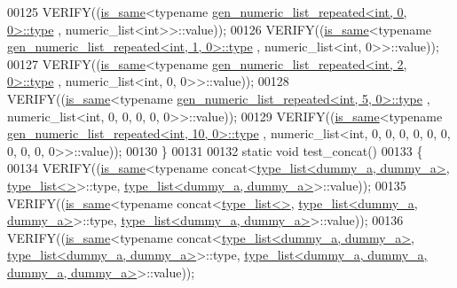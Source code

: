 \begin{DoxyCode}
00125   VERIFY((\hyperlink{struct_eigen_1_1internal_1_1is__same}{is\_same}<\textcolor{keyword}{typename} \hyperlink{struct_eigen_1_1internal_1_1gen__numeric__list__repeated}{gen\_numeric\_list\_repeated<int, 0, 0>::type}
      , numeric\_list<int>>::value));
00126   VERIFY((\hyperlink{struct_eigen_1_1internal_1_1is__same}{is\_same}<\textcolor{keyword}{typename} \hyperlink{struct_eigen_1_1internal_1_1gen__numeric__list__repeated}{gen\_numeric\_list\_repeated<int, 1, 0>::type}
      , numeric\_list<int, 0>>::value));
00127   VERIFY((\hyperlink{struct_eigen_1_1internal_1_1is__same}{is\_same}<\textcolor{keyword}{typename} \hyperlink{struct_eigen_1_1internal_1_1gen__numeric__list__repeated}{gen\_numeric\_list\_repeated<int, 2, 0>::type}
      , numeric\_list<int, 0, 0>>::value));
00128   VERIFY((\hyperlink{struct_eigen_1_1internal_1_1is__same}{is\_same}<\textcolor{keyword}{typename} \hyperlink{struct_eigen_1_1internal_1_1gen__numeric__list__repeated}{gen\_numeric\_list\_repeated<int, 5, 0>::type}
      , numeric\_list<int, 0, 0, 0, 0, 0>>::value));
00129   VERIFY((\hyperlink{struct_eigen_1_1internal_1_1is__same}{is\_same}<\textcolor{keyword}{typename} \hyperlink{struct_eigen_1_1internal_1_1gen__numeric__list__repeated}{gen\_numeric\_list\_repeated<int, 10, 0>::type}
      , numeric\_list<int, 0, 0, 0, 0, 0, 0, 0, 0, 0, 0>>::value));
00130 \}
00131 
00132 \textcolor{keyword}{static} \textcolor{keywordtype}{void} test\_concat()
00133 \{
00134   VERIFY((\hyperlink{struct_eigen_1_1internal_1_1is__same}{is\_same}<\textcolor{keyword}{typename} concat<\hyperlink{struct_eigen_1_1internal_1_1type__list}{type\_list<dummy\_a, dummy\_a>}, 
      \hyperlink{struct_eigen_1_1internal_1_1type__list}{type\_list<>}>::type, \hyperlink{struct_eigen_1_1internal_1_1type__list}{type\_list<dummy\_a, dummy\_a>}>::value));
00135   VERIFY((\hyperlink{struct_eigen_1_1internal_1_1is__same}{is\_same}<\textcolor{keyword}{typename} concat<\hyperlink{struct_eigen_1_1internal_1_1type__list}{type\_list<>}, 
      \hyperlink{struct_eigen_1_1internal_1_1type__list}{type\_list<dummy\_a, dummy\_a>}>::type, 
      \hyperlink{struct_eigen_1_1internal_1_1type__list}{type\_list<dummy\_a, dummy\_a>}>::value));
00136   VERIFY((\hyperlink{struct_eigen_1_1internal_1_1is__same}{is\_same}<\textcolor{keyword}{typename} concat<\hyperlink{struct_eigen_1_1internal_1_1type__list}{type\_list<dummy\_a, dummy\_a>}, 
      \hyperlink{struct_eigen_1_1internal_1_1type__list}{type\_list<dummy\_a, dummy\_a>}>::type, 
      \hyperlink{struct_eigen_1_1internal_1_1type__list}{type\_list<dummy\_a, dummy\_a, dummy\_a, dummy\_a>}>::value));

\end{DoxyCode}
